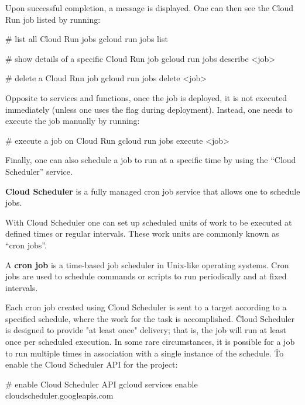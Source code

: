 Upon successful completion, a message is displayed. One can then see the Cloud Run job listed by running:
\begin{bash}
# list all Cloud Run jobs
gcloud run jobs list
\end{bash}

\begin{bash}
# show details of a specific Cloud Run job
gcloud run jobs describe <job>
\end{bash}

\begin{bash}
# delete a Cloud Run job
gcloud run jobs delete <job>
\end{bash}

Opposite to services and functions, once the job is deployed, it is not executed immediately (unless one uses the
 flag during deployment). Instead, one needs to execute the job manually by running:
\begin{bash}
# execute a job on Cloud Run
gcloud run jobs execute <job>
\end{bash}

Finally, one can also schedule a job to run at a specific time by using the ``Cloud Scheduler'' service.

\textbf{Cloud Scheduler} is a fully managed cron job service that allows one to schedule jobs.
\ed

With Cloud Scheduler one can set up scheduled units of work to be executed at defined times or regular intervals.
These work units are commonly known as ``cron jobs''.

A \textbf{cron job} is a time-based job scheduler in Unix-like operating systems. Cron jobs are used to schedule
commands or scripts to run periodically and at fixed intervals.
\ed

Each cron job created using Cloud Scheduler is sent to a target according to a specified schedule, where the work
for the task is accomplished. \v

Cloud Scheduler is designed to provide "at least once" delivery; that is, the job will run at least once per
scheduled execution. In some rare circumstances, it is possible for a job to run multiple times in association with
a single instance of the schedule. \v

To enable the Cloud Scheduler API for the project:
\begin{bash}
# enable Cloud Scheduler API
gcloud services enable cloudscheduler.googleapis.com
\end{bash}

